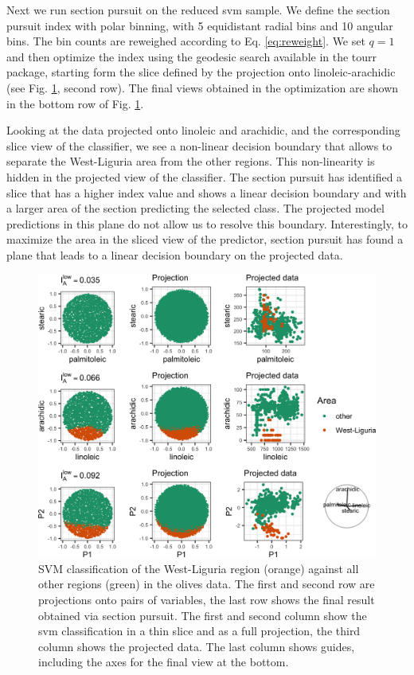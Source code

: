 \documentclass[]{interact}
\theoremstyle{plain}%
\theoremstyle{definition}
\theoremstyle{remark}
\begin{document}
Next we run section pursuit on the reduced svm sample. We define the
section pursuit index with polar binning, with 5 equidistant radial bins
and 10 angular bins. The bin counts are reweighed according to Eq.
\ref{eq:reweight}. We set \(q=1\) and then optimize the index using the
geodesic search available in the tourr package, starting form the slice
defined by the projection onto linoleic-arachidic (see Fig.
\ref{fig:olives}, second row). The final views obtained in the
optimization are shown in the bottom row of Fig. \ref{fig:olives}.

Looking at the data projected onto linoleic and arachidic, and the
corresponding slice view of the classifier, we see a non-linear decision
boundary that allows to separate the West-Liguria area from the other
regions. This non-linearity is hidden in the projected view of the
classifier. The section pursuit has identified a slice that has a higher
index value and shows a linear decision boundary and with a larger area
of the section predicting the selected class. The projected model
predictions in this plane do not allow us to resolve this boundary.
Interestingly, to maximize the area in the sliced view of the predictor,
section pursuit has found a plane that leads to a linear decision
boundary on the projected data.

\begin{figure}
\includegraphics[width=1\linewidth]{section_pursuit_files/figure-latex/olives-1} \caption{SVM classification of the West-Liguria region (orange) against all other regions (green) in the olives data. The first and second row are projections onto pairs of variables, the last row shows the final result obtained via section pursuit. The first and second column show the svm classification in a thin slice and as a full projection, the third column shows the projected data. The last column shows guides, including the axes for the final view at the bottom.}\label{fig:olives}
\end{figure}
\end{document}
